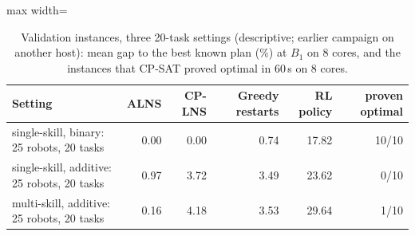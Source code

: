 \begin{table}[h]
\centering
\small
\caption{Validation instances, three 20-task settings (descriptive; earlier campaign on another host): mean gap to the best known plan (\%) at $B_1$ on 8 cores, and the instances that CP-SAT proved optimal in 60\,s on 8 cores.}
\label{tab:supp-small}
\begin{adjustbox}{max width=\textwidth}\begin{tabular}{lrrrrr}
\toprule
Setting & ALNS & CP-LNS & Greedy restarts & RL policy & proven optimal \\
\midrule
single-skill, binary: 25 robots, 20 tasks & 0.00 & 0.00 & 0.74 & 17.82 & 10/10 \\
single-skill, additive: 25 robots, 20 tasks & 0.97 & 3.72 & 3.49 & 23.62 & 0/10 \\
multi-skill, additive: 25 robots, 20 tasks & 0.16 & 4.18 & 3.53 & 29.64 & 1/10 \\
\bottomrule
\end{tabular}\end{adjustbox}
\end{table}
